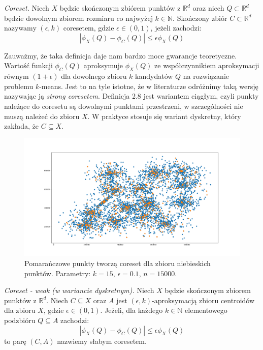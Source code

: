\begin{definition}
    \emph{Coreset.} Niech $X$ będzie skończonym zbiórem punktów z $\mathbb{R}^{d}$ oraz niech $Q \subset \mathbb{R}^{d}$ będzie dowolnym zbiorem rozmiaru co najwyżej $k \in \mathbb{N}$. 
    Skończony zbiór $C \subset \mathbb{R}^{d}$ nazywamy $(\epsilon, k)$ coresetem, gdzie $\epsilon \in (0, 1)$, jeżeli zachodzi:
    \begin{equation}
        |\phi_{X}(Q) - \phi_{C}(Q)| \leq \epsilon\phi_{X}(Q)
    \end{equation}
\end{definition}

\noindent
Zauważmy, że taka definicja daje nam bardzo moce gwarancje teoretyczne.
Wartość funkcji $\phi_{C}(Q)$ aproksymuje $\phi_{X}(Q)$ ze współczynnikiem aproksymacji równym $(1+\epsilon)$ dla dowolnego zbioru $k$ kandydatów $Q$ na rozwiązanie problemu $k$-means.
Jest to na tyle istotne, że w literaturze odróżnimy taką wersję nazywając ją \textit{strong coresetem}.
Definicja 2.8 jest wariantem ciągłym, czyli punkty należące do coresetu są dowolnymi punktami przestrzeni, w szczególności nie muszą należeć do zbioru $X$.
W praktyce stosuje się wariant dyskretny, który zakłada, że $C \subseteq X$.

\begin{figure}[H]
    \centering
    \includegraphics[totalheight=7cm]{coreset.png}
    \caption{Pomarańczowe punkty tworzą coreset dla zbioru niebieskich punktów. 
    Parametry: $k=15$, $\epsilon = 0.1$, $n = 15000$.}
\end{figure}

\begin{definition}
    \emph{Coreset - weak (w wariancie dyskretnym).} Niech $X$ będzie skończonym zbiorem punktów z $\mathbb{R}^{d}$.
    Niech $C \subseteq X$ oraz $A$ jest $(\epsilon, k)$-aproksymacją zbioru centroidów dla zbioru $X$, gdzie $\epsilon \in (0, 1)$.
    Jeżeli, dla każdego $k \in \mathbb{N}$ elementowego podzbióru $Q \subseteq A$ zachodzi:
    \begin{equation}
        |\phi_{X}(Q) - \phi_{C}(Q)| \leq \epsilon\phi_{X}(Q)
    \end{equation}
    to parę $(C, A)$ nazwiemy słabym coresetem.
\end{definition}